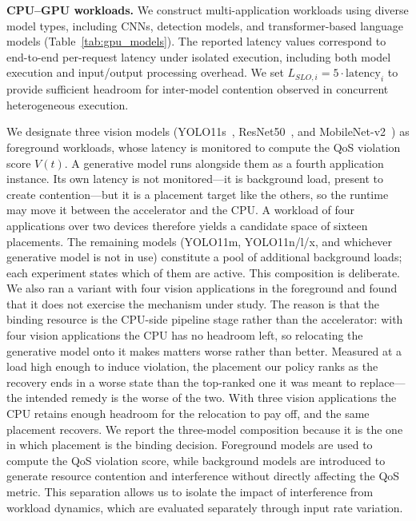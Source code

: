 \documentclass[conference]{IEEEtran}
\begin{document}
\noindent\textbf{\newline CPU--GPU workloads.}
We construct multi-application workloads using diverse model types, including CNNs, detection models, and transformer-based language models (Table~\ref{tab:gpu_models}). 
The reported latency values correspond to end-to-end per-request latency under isolated execution, including both model execution and input/output processing overhead.
We set $L_{SLO,i} = 5 \cdot \text{latency}_i$ to provide sufficient headroom for inter-model contention observed in concurrent heterogeneous execution.

\textcolor{navyblue}{We designate three vision models (YOLO11s~\cite{yolo11}, ResNet50~\cite{resnet}, and MobileNet-v2~\cite{mobilenetv2}) as foreground workloads, whose latency is monitored to compute the QoS violation score $V(t)$. A generative model runs alongside them as a fourth application instance. Its own latency is not monitored---it is background load, present to create contention---but it is a placement target like the others, so the runtime may move it between the accelerator and the CPU. A workload of four applications over two devices therefore yields a candidate space of sixteen placements. The remaining models (YOLO11m, YOLO11n/l/x, and whichever generative model is not in use) constitute a pool of additional background loads; each experiment states which of them are active.}
\textcolor{navyblue}{This composition is deliberate. We also ran a variant with four vision applications in the foreground and found that it does not exercise the mechanism under study. The reason is that the binding resource is the CPU-side pipeline stage rather than the accelerator: with four vision applications the CPU has no headroom left, so relocating the generative model onto it makes matters worse rather than better. Measured at a load high enough to induce violation, the placement our policy ranks as the recovery ends in a worse state than the top-ranked one it was meant to replace---the intended remedy is the worse of the two. With three vision applications the CPU retains enough headroom for the relocation to pay off, and the same placement recovers. We report the three-model composition because it is the one in which placement is the binding decision.}
Foreground models are used to compute the QoS violation score, while background models are introduced to generate resource contention and interference without directly affecting the QoS metric. This separation allows us to isolate the impact of interference from workload dynamics, which are evaluated separately through input rate variation.
\end{document}
